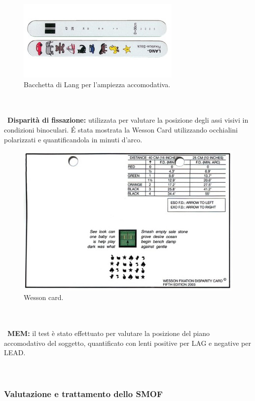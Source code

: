 \begin{figure}[h!]
	\centering
	\includegraphics[scale=0.5]{source/immagini/ampiezza_accomodativa.jpg}
	\caption[Bacchetta di Lang per l'ampiezza accomodativa]{Bacchetta di Lang per l'ampiezza accomodativa.}
	\label{fig:issuexample}
\end{figure}
\\\ \\\ 
\textbf{Disparità di fissazione:} utilizzata per valutare la posizione degli assi visivi in condizioni binoculari. É stata mostrata
la Wesson Card utilizzando occhialini polarizzati e quantificandola in minuti d’arco.

\begin{figure}[h!]
	\centering
	\includegraphics[scale=0.22]{source/immagini/Wesson_card.jpg}
	\caption[Wesson card]{Wesson card.}
	\label{fig:issuexample}
\end{figure}
\\\ \\\
\textbf{MEM:} il test è stato effettuato per valutare la posizione del piano accomodativo del soggetto, quantificato con lenti
positive per LAG e negative per LEAD.
\\\ \\\
\subsubsection{Valutazione e trattamento dello SMOF}

